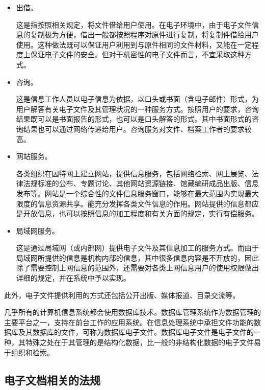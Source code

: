 \begin{enumerate}
\begin{itemize}
            \item  出借。

            这是指按照相关规定，将文件借给用户使用。在电子环境中，由于电子文件信息的复制极为方便，借出一般都按照程序对原件进行复制，将复制件借给用户使用。这种做法既可以保证用户利用到与原件相同的文件材料，又能在一定程度上保证电子文件的安全。但对于机密性的电子文件而言，不宜采取这种方式。

            \item  咨询。

            这是信息工作人员以电子信息为依据，以口头或书面（含电子邮件）形式，为用户解答有关电子文件及其管理状况的一种服务方式。按照用户的要求，咨询结果既可以是书面报告的形式，也可以是口头解答的形式。其中书面形式的咨询结果也可以通过网络传递给用户。咨询服务对文件、档案工作者的要求较高。

            \item  网站服务。

            各类组织在因特网上建立网站，提供信息服务，包括网络检索、网上展览、法律法规标准的公布、专题讨论、其他网站资源链接、馆藏编研成品出版、信息发布等。网站是一个综合性的文件信息服务窗口，能够在最大范围内实现最大限度的信息资源共享。能充分发挥各类文件信息的作用。网站提供的信息都应是开放信息，也可以按照信息的加工程度和有关方面的规定，实行有偿服务。

            \item  局域网服务。

            这是通过局域网（或内部网）提供电子文件及其信息加工的服务方式。而由于局域网所提供的信息是机构内部的信息，其中很多信息内容是不开放的，因此除了需要控制上网信息的范围外，还需要对各类上网信息用户的使用权限做出详细的规定，并在系统中予以实现。
        \end{itemize}

    此外，电子文件提供利用的方式还包括公开出版、媒体报道、目录交流等。

    \end{enumerate}

    几乎所有的计算机信息系统都会使用数据库技术。数据库管理系统作为数据管理的主要平台之一，支持在前台工作的应用系统。在信息处理系统中承担文件功能的数据库及其数据库的文件，可称为数据库电子文件。数据库电子文件是电子文件的一种，其特殊之处在于其管理的是结构化数据，比一般的非结构化数据的电子文件易于组织和检索。

\subsection {电子文档相关的法规}

